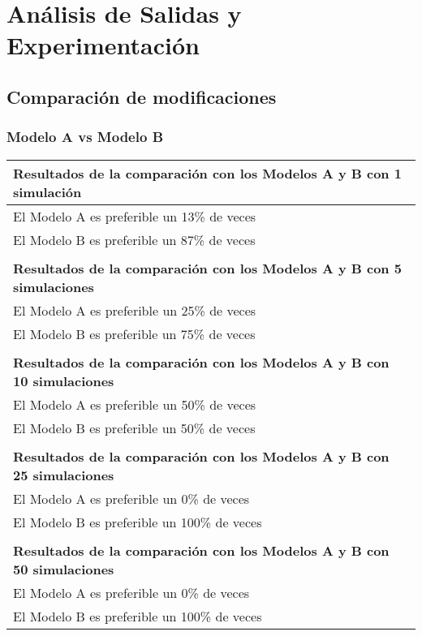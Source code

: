 \chapter{Análisis de Salidas y Experimentación}

\section{Comparación de modificaciones}

\subsection{Modelo A vs Modelo B}
\begin{table}[H]
\centering
\begin{tabular}{|l|}
\hline
\textbf{Resultados de la comparación con los Modelos A  y B con 1 simulación} \\ \hline
El Modelo A es preferible un 13\% de veces \\ \hline
El Modelo B es preferible un 87\% de veces \\ \hline
 \\ \hline
\textbf{Resultados de la comparación con los Modelos A  y B con 5 simulaciones} \\ \hline
El Modelo A es preferible un 25\% de veces \\ \hline
El Modelo B es preferible un 75\% de veces \\ \hline
 \\ \hline
\textbf{Resultados de la comparación con los Modelos A  y B con 10 simulaciones} \\ \hline
El Modelo A es preferible un 50\% de veces \\ \hline
El Modelo B es preferible un 50\% de veces \\ \hline
 \\ \hline
\textbf{Resultados de la comparación con los Modelos A  y B con 25 simulaciones} \\ \hline
El Modelo A es preferible un 0\% de veces \\ \hline
El Modelo B es preferible un 100\% de veces \\ \hline
 \\ \hline
\textbf{Resultados de la comparación con los Modelos A  y B con 50 simulaciones} \\ \hline
El Modelo A es preferible un 0\% de veces \\ \hline
El Modelo B es preferible un 100\% de veces \\ \hline

\end{tabular}
\end{table}
